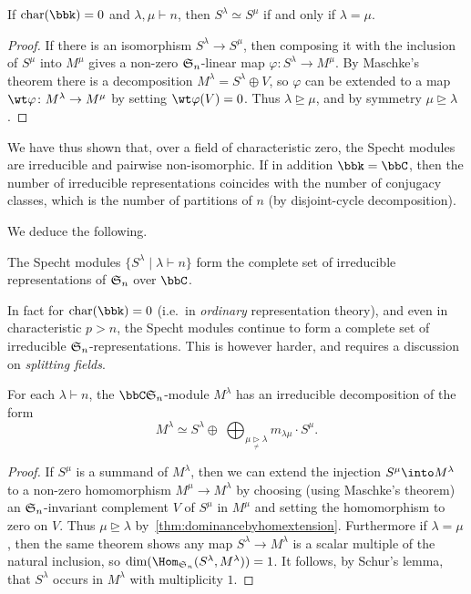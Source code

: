 \begin{corollary}
    If $\textnormal{char}(\bbk)=0$ and $\lambda,\mu\vdash n$, then
    $S^\lambda\simeq S^\mu$ if and only if $\lambda = \mu$.
    \begin{proof}
        If there is an isomorphism $S^\lambda\to S^\mu$, then
        composing it with the inclusion of $S^\mu$ into $M^\mu$ gives a non-zero
        $\mathfrak{S}_{n}$-linear map $\varphi\colon S^\lambda\to M^\mu$. By Maschke's
        theorem there is a decomposition $M^\lambda=S^\lambda\oplus V$, so
        $\varphi$ can be extended to a map $\wt\varphi\colon M^\lambda\to M^\mu$
        by setting $\wt\varphi(V)=0$. Thus $\lambda\unrhd \mu$, and by symmetry
        $\mu\unrhd \lambda$.
    \end{proof}
\end{corollary}

We have thus shown that, over a field of characteristic zero, the Specht modules
are irreducible and pairwise non-isomorphic. If in addition $\bbk = \bbC$, then the
number of irreducible representations coincides with the number of conjugacy
classes, which is the number of partitions of $n$ (by disjoint-cycle decomposition). 

We deduce the following.

\begin{corollary}
    The Specht modules $\{S^\lambda\;|\; \lambda\vdash n\}$ form the complete set of irreducible representations
    of $\mathfrak{S}_{n}$ over $\bbC$.
\end{corollary}

\begin{remark}
    In fact for $\textnormal{char}(\bbk)=0$ (i.e.\ in \emph{ordinary}
    representation theory), and even in characteristic $p>n$, the Specht modules
    continue to form a complete set of irreducible $\mathfrak{S}_{n}$-representations.
    This is however harder, and requires a discussion on \emph{splitting
    fields}.
\end{remark}

\begin{corollary}
    For each $\lambda\vdash n$, the $\bbC \sym n$-module $M^\lambda$ has an
    irreducible decomposition of the form
    \[
        M^\lambda\simeq S^\lambda \oplus \;\bigoplus_{\mu\underset{\neq}{\rhd}
        \lambda}m_{\lambda\mu}\cdot S^\mu.
    \] 
    \begin{proof}
        If $S^\mu$ is a summand of $M^\lambda$, then we can
        extend the injection $S^\mu\into M^\lambda$ to a non-zero homomorphism
        $M^\mu \to M^\lambda$ by choosing (using Maschke's theorem) an $\mathfrak{S}_{n}$-invariant complement $V$ of $S^\mu$ in $M^\mu$ and setting the
        homomorphism to zero on $V$. Thus $\mu \unrhd \lambda$
        by~\cref{thm:dominancebyhomextension}. Furthermore if $\lambda=\mu$,
        then the same theorem shows any map $S^\lambda\to M^\lambda$ is a scalar
        multiple of the natural inclusion, so $\dim(\Hom_{\sym
        n}(S^\lambda,M^\lambda))=1$. It follows, by Schur's lemma, that
        $S^\lambda$ occurs in $M^\lambda$ with multiplicity $1$.
    \end{proof}
\end{corollary}

